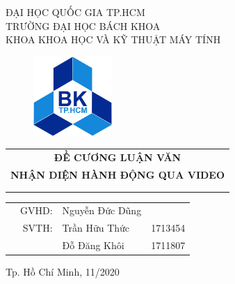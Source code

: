\begin{titlepage}
    \begin{center} \large
        ĐẠI HỌC QUỐC GIA TP.HCM\\
        TRƯỜNG ĐẠI HỌC BÁCH KHOA\\
        KHOA KHOA HỌC VÀ KỸ THUẬT MÁY TÍNH\\
    \end{center}

    \vspace{1.5cm}

    \begin{figure}[h!]
        \begin{center}
            \includegraphics[width=3cm]{asset/image/hcmut-logo.jpg}
        \end{center}
    \end{figure}

    \vspace{1cm}

    \begin{center}
        \begin{tabular}{c}
            {\bf \large ĐỀ CƯƠNG LUẬN VĂN}             \\

            {\bf \large NHẬN DIỆN HÀNH ĐỘNG QUA VIDEO} \\

            \\ \hline \hline \\
        \end{tabular}
    \end{center}

    \vspace{1cm}

    \begin{table}[h]
        \begin{tabular}{rrll}
            \hspace{2.8cm}
             & \large  GVHD:
             & \large Nguyễn Đức Dũng &                                      \\
             & \large  SVTH:
             & \large Trần Hữu Thức   & \large 1713454                       \\
             &                        & \large Đỗ Đăng Khôi & \large 1711807 \\
        \end{tabular}
    \end{table}

    \vspace{2cm}

    \begin{center}
        {\large Tp. Hồ Chí Minh, 11/2020}
    \end{center}
\end{titlepage}
